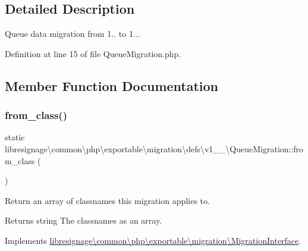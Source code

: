 \subsection{Detailed Description}
Queue data migration from 1.. to 1... 

Definition at line 15 of file Queue\+Migration.\+php.



\subsection{Member Function Documentation}
\mbox{\label{classlibresignage_1_1common_1_1php_1_1exportable_1_1migration_1_1defs_1_1v1__1__0_1_1QueueMigration_afcceac44f8c58cb12921b3ec526d4ec7}} 
\subsubsection{\texorpdfstring{from\+\_\+class()}{from\_class()}}
{\footnotesize\ttfamily static libresignage\textbackslash{}common\textbackslash{}php\textbackslash{}exportable\textbackslash{}migration\textbackslash{}defs\textbackslash{}v1\+\_\+\_\textbackslash{}\+Queue\+Migration\+::from\+\_\+class (\begin{DoxyParamCaption}{ }\end{DoxyParamCaption})\hspace{0.3cm}{\ttfamily [static]}}

Return an array of classnames this migration applies to.

\begin{DoxyReturn}{Returns}
string The classnames as an array. 
\end{DoxyReturn}


Implements \hyperlink{interfacelibresignage_1_1common_1_1php_1_1exportable_1_1migration_1_1MigrationInterface_aa8eb2e4ff59358ae551061687540f724}{libresignage\textbackslash{}common\textbackslash{}php\textbackslash{}exportable\textbackslash{}migration\textbackslash{}\+Migration\+Interface}.



